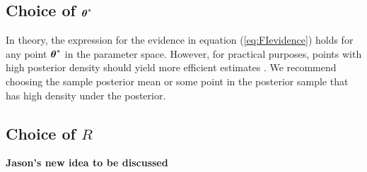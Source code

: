 \documentclass[%
 reprint,
 amsmath,amssymb,
 aps,
]{revtex4-2}
\newcommand{\btheta}{\mbox{\boldmath $\theta$}}
\begin{document}
\subsection{\label{subsec:thetastar} Choice of $\btheta^*$}
In theory, the expression for the evidence in equation (\ref{eq:FIevidence}) holds for any point $\btheta^*$ in the parameter space. However, for practical purposes, points with high posterior density should yield more efficient estimates \cite{chib1995marginal,chib2001marginal}. We recommend choosing the sample posterior mean or some point in the posterior sample that has high density under the posterior.


\subsection{\label{subsec:R} Choice of $R$}
\bigskip

{\bf Jason's new idea to be discussed}
\end{document}
